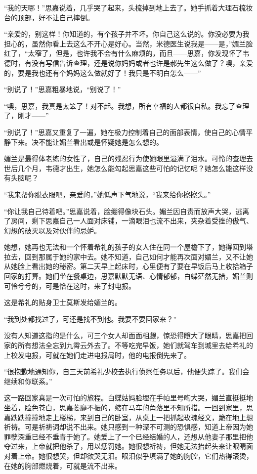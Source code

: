 \par “我的天哪！”思嘉说着，几乎哭了起来，头梳掉到地上去了。她手抓着大理石梳妆台的顶部，好不让自己摔倒。
\par “亲爱的，别这样！你知道的，有个孩子并不坏。你自己这么说的。你没必要为我担心的，虽然你看上去这么不开心是好心。当然，米德医生说我是——是，”媚兰脸红了，“太窄了，但是，也许我不会有什么麻烦的，而且——思嘉，你发现怀了韦德时，有没有写信告诉查理，还是说你妈妈或者也许是郝先生这么做了？噢，亲爱的，要是我也还有个妈妈这么做就好了！我只是不明白怎么——”
\par “别说了！”思嘉粗暴地说，“别说了！”
\par “噢，思嘉，我真是太笨了！对不起。我想，所有幸福的人都很自私。我忘了查理了，刚才——”
\par “别说了！”思嘉又重复了一遍，她在极力控制着自己的面部表情，使自己的心情平静下来。决不能让媚兰看出或是怀疑她是怎么想的。
\par 媚兰是最得体老练的女性了，自己的残忍行为使她眼里溢满了泪水。可怜的查理去世后几个月，韦德才出生，她怎么能勾起思嘉这些可怕的记忆呢？她怎么能这样没有头脑呢？
\par “我来帮你脱衣服吧，亲爱的，”她低声下气地说，“我来给你擦擦头。”
\par “你让我自己待着吧。”思嘉说着，脸绷得像块石头。媚兰因自责而放声大哭，逃离了房间，剩下思嘉自己一人面对床铺，一滴眼泪也流不出来，夹杂着受挫的傲气、幻想的破灭以及对伙伴的忌妒。
\par 她想，她再也无法和一个怀着希礼的孩子的女人住在同一个屋檐下了，她得回到塔拉去，回到那属于她的家中去。她不知道，自己如何才能再次面对媚兰，又不让她从她脸上看出她的秘密。第二天早上起床时，心里便有了要在早饭后马上收拾箱子回家的打算。她们坐在餐桌边，思嘉默默无语、心情郁郁，白蝶茫然无措，媚兰则可怜兮兮的，可是恰在这时，来了封电报。
\par 这是希礼的贴身卫士莫斯发给媚兰的。
\par “我到处都找过了，可还是找不到他。我要不要回家来？”
\par 没有人知道这指的是什么，可三个女人却面面相觑，惊恐得瞪大了眼睛，思嘉把回家的所有想法全忘到九霄云外去了。不等吃完早饭，她们就驾车到城里去给希礼的上校发电报，可就在她们走进电报局时，他的电报倒先来了。
\par “很抱歉地通知你，自三天前希礼少校去执行侦察任务以后，他便失踪了。我们会继续和你联系。”
\par 这一路回家真是一次可怕的旅程。白蝶姑妈脸埋在手帕里号啕大哭，媚兰直挺挺地坐着，脸色苍白，思嘉萎靡不振的，缩在马车的角落里不知所措。一回到家里，思嘉跌跌撞撞地走上楼梯，来到自己的卧室，从桌上一把抓起玫瑰经文，跪在地上想祈祷。可是祈祷词却说不出来。她只感到一种深不可测的恐惧感，知道上帝因为她罪孽深重已经不垂青于她了。她爱上了一个已经结婚的人，还想从他妻子那里把他夺过来，上帝就把他杀了，用以惩罚她。她很想祈祷，但她无法抬起头来让眼睛面对着上帝。她很想哭，但却欲哭无泪。眼泪似乎填满了她的胸腔，它们热得滚烫，在她的胸部燃烧着，可就是流不出来。
